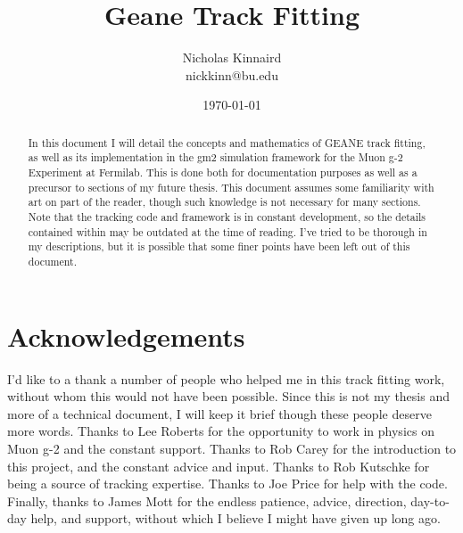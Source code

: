 \documentclass{article}
\begin{document}
\title{Geane Track Fitting}
\author{Nicholas Kinnaird \\ nickkinn@bu.edu}
\date{\today}
\maketitle

\begin{abstract}

    In this document I will detail the concepts and mathematics of GEANE track fitting, as well as its implementation in the gm2 simulation framework for the Muon g-2 Experiment at Fermilab. This is done both for documentation purposes as well as a precursor to sections of my future thesis. This document assumes some familiarity with art on part of the reader, though such knowledge is not necessary for many sections. Note that the tracking code and framework is in constant development, so the details contained within may be outdated at the time of reading. I've tried to be thorough in my descriptions, but it is possible that some finer points have been left out of this document.

\end{abstract}

\tableofcontents













% 







\printbibliography

\section*{Acknowledgements}

	I'd like to a thank a number of people who helped me in this track fitting work, without whom this would not have been possible. Since this is not my thesis and more of a technical document, I will keep it brief though these people deserve more words. Thanks to Lee Roberts for the opportunity to work in physics on Muon g-2 and the constant support. Thanks to Rob Carey for the introduction to this project, and the constant advice and input. Thanks to Rob Kutschke for being a source of tracking expertise. Thanks to Joe Price for help with the code. Finally, thanks to James Mott for the endless patience, advice, direction, day-to-day help, and support, without which I believe I might have given up long ago.
\end{document}
